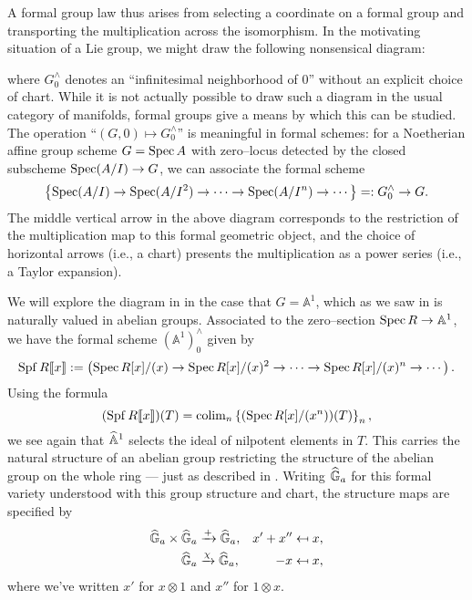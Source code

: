 \begin{remark}\label{LieGpIntuition}
A formal group law thus arises from selecting a coordinate on a formal group and transporting the multiplication across the isomorphism.  In the motivating situation of a Lie group, we might draw the following nonsensical diagram:
\begin{center}
\end{center}
where $G^\wedge_0$ denotes an ``infinitesimal neighborhood of $0$'' without an explicit choice of chart.  While it is not actually possible to draw such a diagram in the usual category of manifolds, formal groups give a means by which this can be studied.  The operation ``$(G, 0) \mapsto G^\wedge_0$'' is meaningful in formal schemes: for a Noetherian affine group scheme $G = \operatorname{Spec} A$ with zero--locus detected by the closed subscheme $\operatorname{Spec} (A/I) \to G$, we can associate the formal scheme \[\left\{ \operatorname{Spec}(A/I) \to \operatorname{Spec}(A/I^2) \to \cdots \to \operatorname{Spec}(A/I^n) \to \cdots \right\} =: G^\wedge_0 \to G.\]  The middle vertical arrow in the above diagram corresponds to the restriction of the multiplication map to this formal geometric object, and the choice of horizontal arrows (i.e., a chart) presents the multiplication as a power series (i.e., a Taylor expansion).
\end{remark}

\begin{example}\label{FormalGaExample}
We will explore the diagram in  in the case that $G = \mathbb A^1$, which as we saw in  is naturally valued in abelian groups.  Associated to the zero--section $\operatorname{Spec} R \to \mathbb A^1$, we have the formal scheme $(\mathbb A^1)^\wedge_0$ given by \[\operatorname{Spf} R\llbracket x \rrbracket := \left(\operatorname{Spec} R[x] / (x) \to \operatorname{Spec} R[x] / (x)^2 \to \cdots \to \operatorname{Spec} R[x] / (x)^n \to \cdots\right).\]  Using the formula \[(\operatorname{Spf} R\llbracket x \rrbracket)(T) = \operatorname{colim}_n \left\{(\operatorname{Spec} R[x]/(x^n))(T)\right\}_n,\] we see again that $\widehat{\mathbb{A}}^1$ selects the ideal of nilpotent elements in $T$.  This carries the natural structure of an abelian group restricting the structure of the abelian group on the whole ring --- just as described in .  Writing $\widehat{\mathbb G}_a$ for this formal variety understood with this group structure and chart, the structure maps are specified by
\begin{align*}
\widehat{\mathbb G}_a \times \widehat{\mathbb G}_a & \xrightarrow{+} \widehat{\mathbb G}_a, & x' + x'' & \mapsfrom x, \\
\widehat{\mathbb G}_a & \xrightarrow{\chi} \widehat{\mathbb G}_a, & -x & \mapsfrom x,
\end{align*}
where we've written $x'$ for $x \otimes 1$ and $x''$ for $1 \otimes x$.
\end{example}

